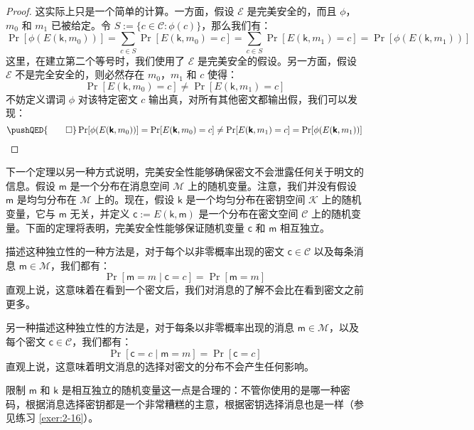 \begin{proof}
这实际上只是一个简单的计算。一方面，假设 $\mathcal{E}$ 是完美安全的，而且 $\phi$，$m_0$ 和 $m_1$ 已被给定。令 $S:=\{c\in\mathcal{C}:\phi(c)\}$，那么我们有：
\[
\Pr[\phi(E(\boldsymbol{\mathsf{k}}, m_0))]=\sum_{c\in S}\Pr[E(\boldsymbol{\mathsf{k}}, m_0) = c]=\sum_{c\in S}\Pr[E(\boldsymbol{\mathsf{k}}, m_1) = c]=\Pr[\phi(E(\boldsymbol{\mathsf{k}}, m_1) )]
\]
这里，在建立第二个等号时，我们使用了 $\mathcal{E}$ 是完美安全的假设。另一方面，假设 $\mathcal{E}$ 不是完全安全的，则必然存在 $m_0$，$m_1$ 和 $c$ 使得：
\[
\Pr[E(\boldsymbol{\mathsf{k}},m_0)=c]\neq
\Pr[E(\boldsymbol{\mathsf{k}},m_1)=c]
\]
不妨定义谓词 $\phi$ 对该特定密文 $c$ 输出真，对所有其他密文都输出假，我们可以发现：
\[
\pushQED{\qed}
\Pr[\phi(E(\boldsymbol{\mathsf{k}}, m_0))]= 
\Pr[E(\boldsymbol{\mathsf{k}}, m_0) = c]\neq
\Pr[E(\boldsymbol{\mathsf{k}}, m_1) = c]=
\Pr[\phi(E(\boldsymbol{\mathsf{k}}, m_1))]\qedhere
\]
\end{proof}

下一个定理以另一种方式说明，完美安全性能够确保密文不会泄露任何关于明文的信息。假设 $\boldsymbol{\mathsf{m}}$ 是一个分布在消息空间 $\mathcal{M}$ 上的随机变量。注意，我们并没有假设 $\boldsymbol{\mathsf{m}}$ 是均匀分布在 $\mathcal{M}$ 上的。现在，假设 $\boldsymbol{\mathsf{k}}$ 是一个均匀分布在密钥空间 $\mathcal{K}$ 上的随机变量，它与 $\boldsymbol{\mathsf{m}}$ 无关，并定义 $\boldsymbol{\mathsf{c}}:=E(\boldsymbol{\mathsf{k}},\boldsymbol{\mathsf{m}})$ 是一个分布在密文空间 $\mathcal{C}$ 上的随机变量。下面的定理将表明，完美安全性能够保证随机变量 $\boldsymbol{\mathsf{c}}$ 和 $\boldsymbol{\mathsf{m}}$ 相互独立。

描述这种独立性的一种方法是，对于每个以非零概率出现的密文 $\boldsymbol{\mathsf{c}}\in\mathcal{C}$ 以及每条消息 $\boldsymbol{\mathsf{m}}\in\mathcal{M}$，我们都有：
\[
\Pr[\boldsymbol{\mathsf{m}}=m\;|\;\boldsymbol{\mathsf{c}}=c]=
\Pr[\boldsymbol{\mathsf{m}}=m]
\]
直观上说，这意味着在看到一个密文后，我们对消息的了解不会比在看到密文之前更多。

另一种描述这种独立性的方法是，对于每条以非零概率出现的消息 $\boldsymbol{\mathsf{m}}\in\mathcal{M}$，以及每个密文 $\boldsymbol{\mathsf{c}}\in\mathcal{C}$，我们都有：
\[
\Pr[\boldsymbol{\mathsf{c}}=c\;|\;\boldsymbol{\mathsf{m}}=m]=
\Pr[\boldsymbol{\mathsf{c}}=c]
\]
直观上说，这意味着明文消息的选择对密文的分布不会产生任何影响。

限制 $\boldsymbol{\mathsf{m}}$ 和 $\boldsymbol{\mathsf{k}}$ 是相互独立的随机变量这一点是合理的：不管你使用的是哪一种密码，根据消息选择密钥都是一个非常糟糕的主意，根据密钥选择消息也是一样（参见练习 \ref{exer:2-16}）。

